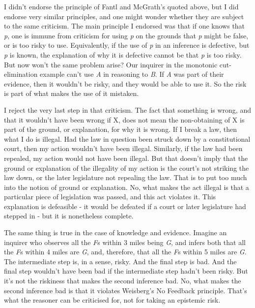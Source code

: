 \documentclass[
  12pt,
  letterpaper,
]{scrbook}
\begin{document}
I didn't endorse the principle of Fantl and McGrath's quoted above, but
I did endorse very similar principles, and one might wonder whether they
are subject to the same criticism. The main principle I endorsed was
that if one knows that \emph{p}, one is immune from criticism for using
\emph{p} on the grounds that \emph{p} might be false, or is too risky to
use. Equivalently, if the use of \emph{p} in an inference is defective,
but \emph{p} is known, the explanation of why it is defective cannot be
that \emph{p} is too risky. But now won't the same problem arise? Our
inquirer in the monotonic cut-elimination example can't use \emph{A} in
reasoning to \emph{B}. If \emph{A} was part of their evidence, then it
wouldn't be risky, and they would be able to use it. So the risk is part
of what makes the use of it mistaken.

I reject the very last step in that criticism. The fact that something
is wrong, and that it wouldn't have been wrong if X, does not mean the
non-obtaining of X is part of the ground, or explanation, for why it is
wrong. If I break a law, then what I do is illegal. Had the law in
question been struck down by a constitutional court, then my action
wouldn't have been illegal. Similarly, if the law had been repealed, my
action would not have been illegal. But that doesn't imply that the
ground or explanation of the illegality of my action is the court's not
striking the law down, or the later legislature not repealing the law.
That is to put too much into the notion of ground or explanation. No,
what makes the act illegal is that a particular piece of legislation was
passed, and this act violates it. This explanation is defeasible - it
would be defeated if a court or later legislature had stepped in - but
it is nonetheless complete.

The same thing is true in the case of knowledge and evidence. Imagine an
inquirer who observes all the \emph{F}s within 3 miles being \emph{G},
and infers both that all the \emph{F}s within 4 miles are \emph{G}, and,
therefore, that all the \emph{F}s within 5 miles are \emph{G}. The
intermediate step is, in a sense, risky. And the final step is bad. And
the final step wouldn't have been bad if the intermediate step hadn't
been risky. But it's not the riskiness that makes the second inference
bad. No, what makes the second inference bad is that it violates
Weisberg's No Feedback principle. That's what the reasoner can be
criticised for, not for taking an epistemic risk.
\end{document}
